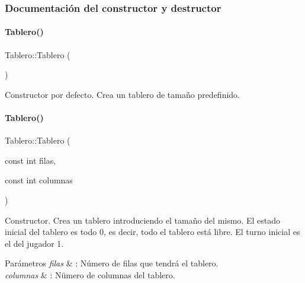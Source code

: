 \subsubsection{Documentación del constructor y destructor}
\hypertarget{classTablero_ab4912f28f1db392e1dd44ddc98bd4f59}{}\label{classTablero_ab4912f28f1db392e1dd44ddc98bd4f59} 
\paragraph{\texorpdfstring{Tablero()}{Tablero()}\hspace{0.1cm}{\footnotesize\ttfamily [1/3]}}
{\footnotesize\ttfamily Tablero\+::\+Tablero (\begin{DoxyParamCaption}{ }\end{DoxyParamCaption})}



Constructor por defecto. Crea un tablero de tamaño predefinido. 

\hypertarget{classTablero_a51ae562c7dee2909d0fa335b8c3eaf71}{}\label{classTablero_a51ae562c7dee2909d0fa335b8c3eaf71} 
\paragraph{\texorpdfstring{Tablero()}{Tablero()}\hspace{0.1cm}{\footnotesize\ttfamily [2/3]}}
{\footnotesize\ttfamily Tablero\+::\+Tablero (\begin{DoxyParamCaption}\item[{const int}]{filas,  }\item[{const int}]{columnas }\end{DoxyParamCaption})}



Constructor. Crea un tablero introduciendo el tamaño del mismo. El estado inicial del tablero es todo 0, es decir, todo el tablero está libre. El turno inicial es el del jugador 1. 


\begin{DoxyParams}{Parámetros}
{\em filas} & \+: Número de filas que tendrá el tablero. \\
\hline
{\em columnas} & \+: Nümero de columnas del tablero. \\
\hline
\end{DoxyParams}
\hypertarget{classTablero_a95ccd1353038a966ad3304ead106c0d4}{}\label{classTablero_a95ccd1353038a966ad3304ead106c0d4} 
